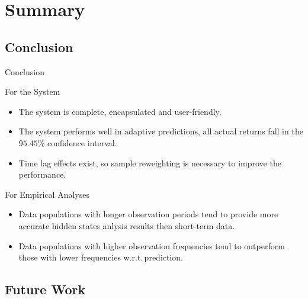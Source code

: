 
\section{\large Summary}


\subsection{Conclusion}

\begin{frame}[fragile,t]{Conclusion}
	\begin{block}{For the System}
    \begin{itemize}
    \item The system is complete, encapsulated and user-friendly.
    \item The system performs well in adaptive predictions, 
    	all actual returns fall in the $95.45\%$ confidence interval.
    \item Time lag effects exist, so sample reweighting is necessary to improve the performance.
    \end{itemize}
    \end{block}
    
    \begin{block}{For Empirical Analyses}
    \begin{itemize}
    \item Data populations with longer observation periods tend to 
    	provide more accurate hidden states anlysis results then short-term data.
    \item Data populations with higher observation frequencies
		tend to outperform those with lower frequencies w.r.t.\,prediction.
    \end{itemize}
    \end{block}
\end{frame}


\subsection{Future Work}

